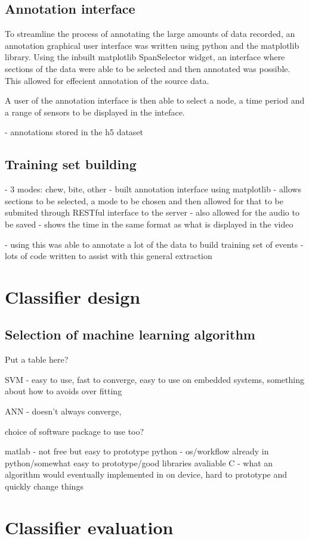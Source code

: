 \subsection{Annotation interface}

To streamline the process of annotating the large amounts of data recorded, an annotation graphical user interface was written using python and the matplotlib library. Using the inbuilt matplotlib SpanSelector widget, an interface where sections of the data were able to be selected and then annotated was possible. This allowed for effecient annotation of the source data. 

A user of the annotation interface is then able to select a node, a time period and a range of sensors to be displayed in the inteface. 

- annotations stored in the h5 dataset


\subsection{Training set building}

- 3 modes: chew, bite, other
- built annotation interface using matplotlib
	- allows sections to be selected, a mode to be chosen and then allowed for that to be submited through RESTful interface to the server
- also allowed for the audio to be saved
- shows the time in the same format as what is displayed in the video

- using this was able to annotate a lot of the data to build training set of events
- lots of code written to assist with this general extraction

\section{Classifier design}

\subsection{Selection of machine learning algorithm}

Put a table here?

SVM - easy to use, fast to converge, easy to use on embedded systems, something about how to avoids over fitting

ANN - doesn't always converge, 


choice of software package to use too?

matlab - not free but easy to prototype
python - os/workflow already in python/somewhat easy to prototype/good libraries avaliable
C - what an algorithm would eventually implemented in on device, hard to prototype and quickly change things


\section{Classifier evaluation}
